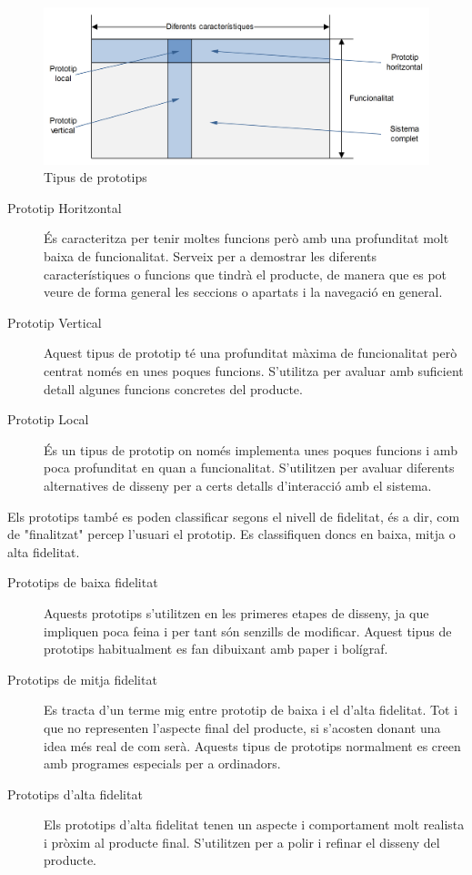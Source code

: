 \begin{figure}[ht]
\centering
\includegraphics[scale=0.8]{Types_prototypes.png}
\caption{Tipus de prototips}\label{fig:types_prototypes}
\end{figure}

\begin{description}
\item[Prototip Horitzontal] És caracteritza per tenir moltes funcions però amb una profunditat molt baixa de funcionalitat. Serveix per a demostrar les diferents característiques o funcions que tindrà el producte, de manera que es pot veure de forma general les seccions o apartats i la navegació en general.
\item[Prototip Vertical] Aquest tipus de prototip té una profunditat màxima de funcionalitat però centrat només en unes poques funcions. S'utilitza per avaluar amb suficient detall algunes funcions concretes del producte. 
\item[Prototip Local] És un tipus de prototip on només implementa unes poques funcions i amb poca profunditat en quan a funcionalitat. S'utilitzen per avaluar diferents alternatives de disseny per a certs detalls d'interacció amb el sistema. 
\end{description}

Els prototips també es poden classificar segons el nivell de fidelitat, és a dir, com de "finalitzat" percep l'usuari el prototip. Es classifiquen doncs en baixa, mitja o alta fidelitat. 

\begin{description}
\item[Prototips de baixa fidelitat] Aquests prototips s'utilitzen en les primeres etapes de disseny, ja que impliquen poca feina i per tant són senzills de modificar. Aquest tipus de prototips habitualment es fan dibuixant amb paper i bolígraf. 
\item[Prototips de mitja fidelitat] Es tracta d'un terme mig entre prototip de baixa i el d'alta fidelitat. Tot i que no representen l'aspecte final del producte, si s'acosten donant una idea més real de com serà. Aquests tipus de prototips normalment es creen amb programes especials per a ordinadors.
\item[Prototips d'alta fidelitat] Els prototips d'alta fidelitat tenen un aspecte i comportament molt realista i pròxim al producte final. S'utilitzen per a polir i refinar el disseny del producte. 
\end{description}

